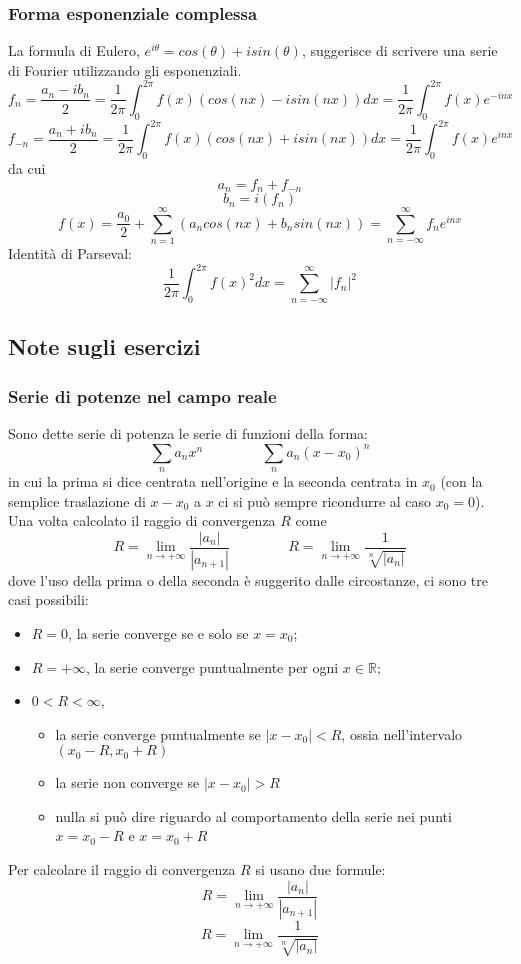 \subsubsection{Forma esponenziale complessa}
La formula di Eulero, $e^{i \theta} = cos(\theta) + i sin(\theta)$, suggerisce di scrivere una serie di Fourier utilizzando gli esponenziali.
\[
    f_n =\frac{a_n-ib_n}{2} = \frac{1}{2\pi} \int_{0}^{2\pi}f(x)(cos(nx) - i sin(nx))dx = \frac{1}{2\pi} \int_{0}^{2\pi}f(x) e^{-inx}
\]
\[
    f_{-n} =\frac{a_n + ib_n}{2} = \frac{1}{2\pi} \int_{0}^{2\pi}f(x)(cos(nx) + i sin(nx))dx = \frac{1}{2\pi} \int_{0}^{2\pi}f(x) e^{inx}
\]
da cui
\[
    a_n = f_n + f_{-n}
\]
\[
    b_n = i (f_n)
\]
\[
    f(x) = \frac{a_0}{2} + \sum_{n=1}^{\infty} \left( a_n cos(nx) + b_n sin(nx) \right) = \sum_{n=-\infty}^{\infty} f_n e^{inx}
\]
\newline
Identità di Parseval:
\[
    \frac{1}{2\pi}\int_{0}^{2\pi}f(x)^2dx = \sum_{n=-\infty}^{\infty}|f_n|^2
\]
\subsection{Note sugli esercizi}
\subsubsection{Serie di potenze nel campo reale}
Sono dette serie di potenza le serie di funzioni della forma:
\[
    \sum_{n} a_nx^n \;\;\;\;\;\;\;\;\;\;\;\;\;\;\;\sum_{n}a_n(x-x_0)^n
\]
in cui la prima si dice centrata nell'origine e la seconda centrata in $x_0$ (con la semplice traslazione di $x-x_0$ a $x$ ci si può sempre ricondurre al caso $x_0 = 0$).\newline
\newline
Una volta calcolato il raggio di convergenza $R$ come
\[
    R = \lim_{n\rightarrow +\infty} \frac{|a_n|}{|a_{n+1}|} \;\;\;\;\;\;\;\;\;\;\;\;\;\;\;R = \lim_{n\rightarrow +\infty} \frac{1}{\sqrt[n]{|a_n|}}
\] dove l'uso della prima o della seconda è suggerito dalle circostanze, ci sono tre casi possibili:
\begin{itemize}
    \item $R = 0$, la serie converge se e solo se $x = x_0$;
    \item $R = +\infty$, la serie converge puntualmente per ogni $x \in \mathbb{R}$;
    \item $0 < R < \infty$, \begin{itemize}
        \item la serie converge puntualmente se $|x-x_0| < R$, ossia nell'intervalo $(x_0-R, x_0 + R)$
        \item la serie non converge se $|x-x_0| > R$
        \item nulla si può dire riguardo al comportamento della serie nei punti $x = x_0 - R$ e $x= x_0+R$
    \end{itemize}
\end{itemize}
Per calcolare il raggio di convergenza $R$ si usano due formule:
\[
    R = \lim_{n\rightarrow +\infty} \frac{|a_n|}{|a_{n+1}|}
\]
\[
    R = \lim_{n\rightarrow +\infty} \frac{1}{\sqrt[n]{|a_n|}}
\]
